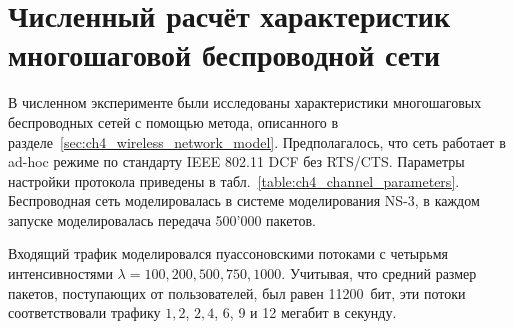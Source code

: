 \section{Численный расчёт характеристик многошаговой беспроводной сети}\label{sec:ch4_results_networks}

В численном эксперименте были исследованы характеристики многошаговых беспроводных сетей с помощью метода, описанного в разделе~\ref{sec:ch4_wireless_network_model}. Предполагалось, что сеть работает в ad-hoc режиме по стандарту IEEE 802.11 DCF без RTS/CTS. Параметры настройки протокола приведены в табл.~\ref{table:ch4_channel_parameters}. Беспроводная сеть моделировалась в системе моделирования NS-3, в каждом запуске моделировалась передача 500'000 пакетов.

\begin{table}[h!]\end{table}

Входящий трафик моделировался пуассоновскими потоками с четырьмя интенсивностями $\lambda = 100, 200, 500, 750, 1000$. Учитывая, что средний размер пакетов, поступающих от пользователей, был равен 11200~бит, эти потоки соответствовали трафику $1,2$, $2,4$, 6, 9 и 12 мегабит в секунду.

